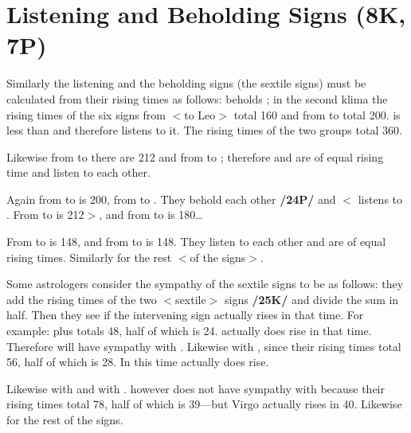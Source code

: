 \section{Listening and Beholding Signs (8K, 7P)}

Similarly the listening and the beholding signs (the sextile signs) must be calculated from their rising times as follows: \Pisces\xspace beholds \Taurus\xspace; in the second klima the rising times of the six signs from \Pisces\xspace $<$to Leo$>$ total 160 and from \Taurus\xspace to \Libra\xspace total 200. \Pisces\xspace is less than \Taurus\xspace and therefore listens to it. The rising times of the two groups total 360. 

Likewise from \Gemini\xspace to \Scorpio\xspace there are 212 and from \Leo\xspace to \Capricorn\xspace 212; therefore \Gemini\xspace and \Leo\xspace are of equal rising time and listen to each other. 

Again from \Virgo\xspace to \Aquarius\xspace is 200, from \Scorpio\xspace to \Aries\xspace 160. They behold each other \textbf{/24P/} and $<$\Scorpio\xspace listens to \Virgo\xspace. From \Leo\xspace to \Capricorn\xspace is 212$>$, and from \Libra\xspace to \Pisces\xspace is 180\ldots 

From \Sagittarius\xspace to \Taurus\xspace is 148, and from \Aquarius\xspace to \Cancer\xspace is 148. They listen to each other and are of equal rising times. Similarly for the rest $<$of the signs$>$.

Some astrologers consider the sympathy of the sextile signs to be as follows: they add the rising times of the two $<$sextile$>$ signs \textbf{/25K/} and divide the sum in half. Then they see if the intervening sign actually rises in that time. For example: \Aries\xspace 20 plus \Gemini\xspace 28 totals 48, half of which is 24. \Taurus\xspace actually does rise in that time. Therefore \Aries\xspace will have sympathy with \Gemini\xspace. Likewise \Taurus\xspace with \Cancer, since their rising times total 56, half of which is 28. In this time \Gemini\xspace actually does rise. 

Likewise \Gemini\xspace with \Leo\xspace and \Cancer\xspace with \Virgo. \Leo\xspace however does not have sympathy with \Libra\xspace because their rising times total 78, half of which is 39—but Virgo actually rises in 40. Likewise for the rest of the signs.

\newpage